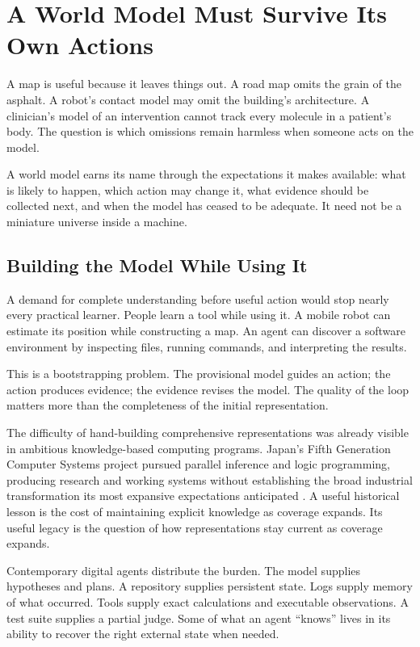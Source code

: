 \section{A World Model Must Survive Its Own Actions}

A map is useful because it leaves things out. A road map omits the grain of the asphalt. A robot's contact model may omit the building's architecture. A clinician's model of an intervention cannot track every molecule in a patient's body. The question is which omissions remain harmless when someone acts on the model.

A world model earns its name through the expectations it makes available: what is likely to happen, which action may change it, what evidence should be collected next, and when the model has ceased to be adequate. It need not be a miniature universe inside a machine.

\subsection{Building the Model While Using It}

A demand for complete understanding before useful action would stop nearly every practical learner. People learn a tool while using it. A mobile robot can estimate its position while constructing a map. An agent can discover a software environment by inspecting files, running commands, and interpreting the results.

This is a bootstrapping problem. The provisional model guides an action; the action produces evidence; the evidence revises the model. The quality of the loop matters more than the completeness of the initial representation.

The difficulty of hand-building comprehensive representations was already visible in ambitious knowledge-based computing programs. Japan's Fifth Generation Computer Systems project pursued parallel inference and logic programming, producing research and working systems without establishing the broad industrial transformation its most expansive expectations anticipated \cite{aiso1988fifth,feigenbaum1993japanese}. A useful historical lesson is the cost of maintaining explicit knowledge as coverage expands. Its useful legacy is the question of how representations stay current as coverage expands.

Contemporary digital agents distribute the burden. The model supplies hypotheses and plans. A repository supplies persistent state. Logs supply memory of what occurred. Tools supply exact calculations and executable observations. A test suite supplies a partial judge. Some of what an agent “knows” lives in its ability to recover the right external state when needed.

